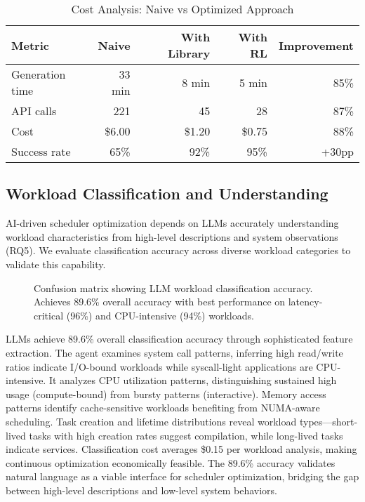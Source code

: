 \begin{table}[h]
\caption{Cost Analysis: Naive vs Optimized Approach}
\label{tab:cost-analysis}
\begin{tabular}{lrrrr}
\toprule
Metric & Naive & With Library & With RL & Improvement \\
\midrule
Generation time & 33 min & 8 min & 5 min & 85\% \\
API calls & 221 & 45 & 28 & 87\% \\
Cost & \$6.00 & \$1.20 & \$0.75 & 88\% \\
Success rate & 65\% & 92\% & 95\% & +30pp \\
\bottomrule
\end{tabular}
\end{table}

\subsection{Workload Classification and Understanding}

AI-driven scheduler optimization depends on LLMs accurately understanding workload characteristics from high-level descriptions and system observations (RQ5). We evaluate classification accuracy across diverse workload categories to validate this capability.

\begin{figure}[h]
\centering
{}
\caption{Confusion matrix showing LLM workload classification accuracy. Achieves 89.6\% overall accuracy with best performance on latency-critical (96\%) and CPU-intensive (94\%) workloads.}
\label{fig:workload-classification}
\end{figure}

LLMs achieve 89.6\% overall classification accuracy through sophisticated feature extraction. The agent examines system call patterns, inferring high read/write ratios indicate I/O-bound workloads while syscall-light applications are CPU-intensive. It analyzes CPU utilization patterns, distinguishing sustained high usage (compute-bound) from bursty patterns (interactive). Memory access patterns identify cache-sensitive workloads benefiting from NUMA-aware scheduling. Task creation and lifetime distributions reveal workload types—short-lived tasks with high creation rates suggest compilation, while long-lived tasks indicate services. Classification cost averages \$0.15 per workload analysis, making continuous optimization economically feasible. The 89.6\% accuracy validates natural language as a viable interface for scheduler optimization, bridging the gap between high-level descriptions and low-level system behaviors.

